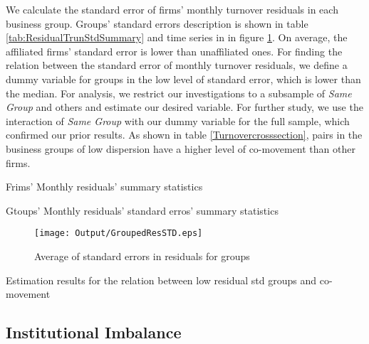 We calculate the standard error of firms' monthly turnover residuals in each business group. Groups' standard errors description is shown in table \ref{tab:ResidualTrunStdSummary} and time series in in figure \ref{fig:GroupedResSTD}. On average, the affiliated firms' standard error is lower than unaffiliated ones. For finding the relation between the standard error of monthly turnover residuals, we define a dummy variable for groups in the low level of standard error, which is lower than the median. For analysis, we restrict our investigations to a subsample of \textit{Same Group} and others and estimate our desired variable.   For further study, we use the interaction of \textit{Same Group} with our dummy variable for the full sample, which confirmed our prior results. As shown in table \ref{Turnovercrosssection}, pairs in the business groups of low dispersion have a higher level of co-movement than other firms.


{			\begin{table}[htbp]
	\centering
	\caption{Frims' Monthly residuals' summary statistics}
	\label{tab:ResidualTrunSummary}
	\resizebox{0.8\textwidth}{!}{
		
	}
\end{table}	
		\begin{table}[htbp]
			\centering
			\caption{Gtoups' Monthly residuals' standard erros' summary statistics}
			\label{tab:ResidualTrunStdSummary}
			\resizebox{0.8\textwidth}{!}{
				
			}
		\end{table}
\begin{figure}[htbp]
	\centering
	\texttt{[image: Output/GroupedResSTD.eps]}

	\caption{Average of standard errors in residuals for groups}
	\label{fig:GroupedResSTD}
\end{figure}
		\begin{table}[htbp]
			\centering
			\caption{Estimation results for the relation between low residual std groups and co-movement}
			\label{Turnovercrosssection}
			\resizebox{\textwidth}{!}{
				\centering
				
			}			
		\end{table}}




\FloatBarrier

%
%
\subsection{{Institutional Imbalance}}

